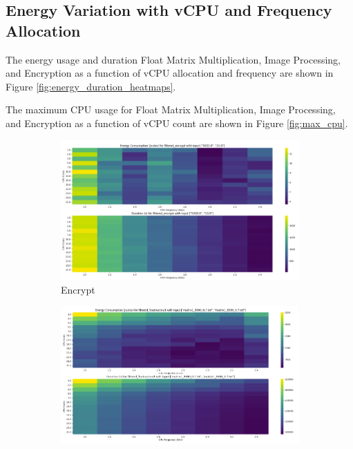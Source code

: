 \documentclass[times, 10pt,twocolumn]{article}
\begin{document}
\subsection{Energy Variation with vCPU and Frequency Allocation}
\label{appendix:energy_variation_vcpu_frequency}
The energy usage and duration Float Matrix Multiplication, Image Processing, and Encryption as a function of vCPU allocation and frequency are shown in Figure \ref{fig:energy_duration_heatmaps}. 

The maximum CPU usage for Float Matrix Multiplication, Image Processing, and Encryption as a function of vCPU count are shown in Figure \ref{fig:max_cpu}. 

\begin{figure}[ht]
   \centering
   \begin{subfigure}[b]{0.33\textwidth}
     \includegraphics[width=\textwidth]{imgs/study_1_results/heatmaps/energy_encrypt.png}
     \caption{Encrypt}
     \label{fig:energy_encrypt}
   \end{subfigure}
   \hfill
   \begin{subfigure}[b]{0.33\textwidth}
      \includegraphics[width=\textwidth]{imgs/study_1_results/heatmaps/energy_floatmatmult.png}

\end{subfigure}
\end{figure}
\end{document}
